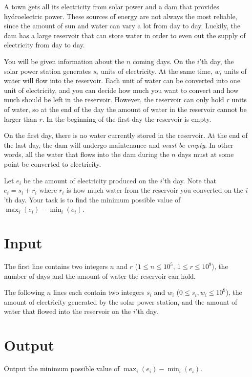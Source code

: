 
A town gets all its electricity from solar power and a dam that provides hydroelectric power.
These sources of energy are not always the most reliable, since the amount of sun and water can
vary a lot from day to day. Luckily, the dam has a large reservoir that can store water in order
to even out the supply of electricity from day to day.

You will be given information about the $n$ coming days. On the $i$'th day, the solar power station
generates $s_i$ units of electricity. At the same time, $w_i$ units of water will flow into the
reservoir. Each unit of water can be converted into one unit of electricity, and you can decide
how much you want to convert and how much should be left in the reservoir.
However, the reservoir can only hold $r$ units of water, so at the end of the day the amount of
water in the reservoir cannot be larger than $r$. In the beginning of the first day
the reservoir is empty.

On the first day, there is no water currently stored in the reservoir.  At the end of the last day, the dam will undergo maintenance and \textit{must be empty}. In other words,
all the water that flows into the dam during the $n$ days must at some point be converted to electricity.

Let $e_i$ be the amount of electricity produced on the $i$'th day. Note that $e_i = s_i + r_i$
where $r_i$ is how much water from the reservoir you converted on the $i$'th day.
Your task is to find the minimum possible value of  $\max_i(e_i) - \min_i(e_i)$.

\section*{Input}

The first line contains two integers $n$ and $r$ ($1 \leq n \leq 10^5$, $1 \leq r \leq 10^9$),
the number of days and the amount of water the reservoir can hold.

The following $n$ lines each contain two integers $s_i$ and $w_i$ ($0 \leq s_i, w_i \leq 10^9$),
the amount of electricity generated by the solar power station, and the amount of water that flowed
into the reservoir on the $i$'th day.

\section*{Output}

Output the minimum possible value of $\max_i(e_i) - \min_i(e_i)$.
